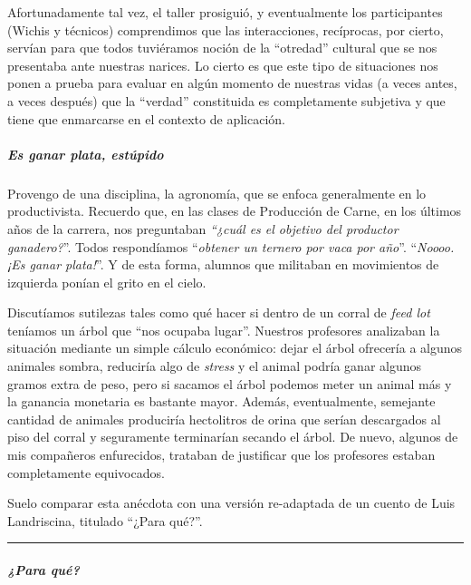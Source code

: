 \documentclass[
]{article}
\begin{document}
Afortunadamente tal vez, el taller prosiguió, y eventualmente los
participantes (Wichis y técnicos) comprendimos que las interacciones,
recíprocas, por cierto, servían para que todos tuviéramos noción de la
``otredad'' cultural que se nos presentaba ante nuestras narices. Lo
cierto es que este tipo de situaciones nos ponen a prueba para evaluar
en algún momento de nuestras vidas (a veces antes, a veces después) que
la ``verdad'' constituida es completamente subjetiva y que tiene que
enmarcarse en el contexto de aplicación.

\hypertarget{es-ganar-plata-estuxfapido}{%
\subparagraph{Es ganar plata,
estúpido}\label{es-ganar-plata-estuxfapido}}

Provengo de una disciplina, la agronomía, que se enfoca generalmente en
lo productivista. Recuerdo que, en las clases de Producción de Carne, en
los últimos años de la carrera, nos preguntaban \emph{``¿cuál es el
objetivo del productor ganadero?}''. Todos respondíamos ``\emph{obtener
un ternero por vaca por año}''. ``\emph{Noooo. ¡Es ganar plata!}''. Y de
esta forma, alumnos que militaban en movimientos de izquierda ponían el
grito en el cielo.

Discutíamos sutilezas tales como qué hacer si dentro de un corral de
\emph{feed lot} teníamos un árbol que ``nos ocupaba lugar''. Nuestros
profesores analizaban la situación mediante un simple cálculo económico:
dejar el árbol ofrecería a algunos animales sombra, reduciría algo de
\emph{stress} y el animal podría ganar algunos gramos extra de peso,
pero si sacamos el árbol podemos meter un animal más y la ganancia
monetaria es bastante mayor. Además, eventualmente, semejante cantidad
de animales produciría hectolitros de orina que serían descargados al
piso del corral y seguramente terminarían secando el árbol. De nuevo,
algunos de mis compañeros enfurecidos, trataban de justificar que los
profesores estaban completamente equivocados.

Suelo comparar esta anécdota con una versión re-adaptada de un cuento de
Luis Landriscina, titulado ``¿Para qué?''.

\begin{center}\rule{0.5\linewidth}{\linethickness}\end{center}

\hypertarget{para-quuxe9}{%
\subparagraph{¿Para qué?}\label{para-quuxe9}}
\end{document}
